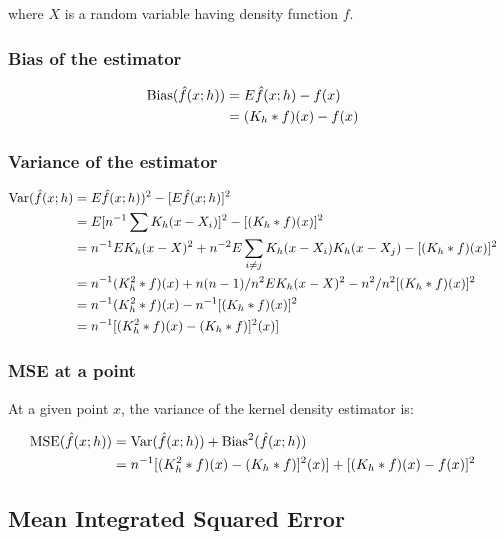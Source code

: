 where $X$ is a random variable having density function $f$.

\subsubsection{Bias of the estimator}

\begin{align}
\mbox{Bias}(\hat{f}(x;h)) & = E \hat{f}(x;h) - f(x) && \nonumber \\
    & = (K_h \ast f)(x) - f(x) &&
\end{align}

\subsubsection{Variance of the estimator}

\begin{align}
\mbox{Var}(\hat{f}(x;h) & = E\hat{f}(x;h))^2 - [E\hat{f}(x;h)]^2 && \nonumber \\
    & = E[n^{-1}\sum{K_h(x - X_i)}]^2 - [(K_h \ast f)(x)]^2 && \nonumber \\
    & = n^{-1} E K_h(x - X)^2 + n^{-2} E \sum_{i \neq j}{K_h(x-X_i)K_h(x-X_j)} - [(K_h \ast f)(x)]^2 && \nonumber \\
    & = n^{-1} (K_h^2 \ast f)(x) + n(n - 1) / n^2 E K_h(x - X)^2 - n^2 / n^2 [(K_h \ast f)(x)]^2 && \nonumber \\
    & = n^{-1} (K_h^2 \ast f)(x) - n^{-1} [(K_h \ast f)(x)]^2 && \nonumber \\
    & = n^{-1} [(K_h^2 \ast f)(x) - (K_h \ast f)]^2(x)]
\end{align}

\subsubsection{MSE at a point}

At a given point $x$, the variance of the kernel density estimator is:

\begin{align}
\mbox{MSE}(\hat{f}(x;h)) & = \mbox{Var}(\hat{f}(x;h)) + \mbox{Bias}^2(\hat{f}(x;h)) && \nonumber \\
    & = n^{-1} [(K_h^2 \ast f)(x) - (K_h \ast f)]^2(x)] + [(K_h \ast f)(x) - f(x)]^2 \label{eq:MSE}
\end{align}

\subsection{Mean Integrated Squared Error}

